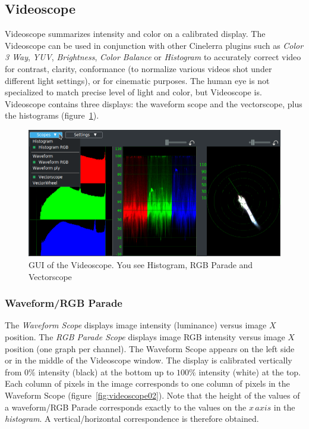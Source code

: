 {\subsection{Videoscope}%
\label{sub:videoscope}

Videoscope summarizes intensity and color on a calibrated display. The Videoscope can be used in conjunction with other Cinelerra plugins such as \textit{Color 3 Way}, \textit{YUV}, \textit{Brightness}, \textit{Color Balance} or \textit{Histogram} to accurately correct video for contrast, clarity, conformance (to normalize various videos shot under different light settings), or for cinematic purposes. The human eye is not specialized to match precise level of light and color, but Videoscope is. Videoscope contains three displays: the waveform scope and the vectorscope, plus the histograms (figure~\ref{fig:videoscope01}).

\begin{figure}[hbtp]
    \centering
    \includegraphics[width=0.8\linewidth]{images/videoscope01.png}
    \caption{GUI of the Videoscope. You see Histogram, RGB Parade and Vectorscope}
    \label{fig:videoscope01}
\end{figure}

\subsubsection*{Waveform/RGB Parade}%
\label{ssub:waveform_rgb_parade}

The \textit{Waveform Scope} displays image intensity (luminance) versus image $X$ position. The \textit{RGB Parade Scope} displays image RGB intensity versus image $X$ position (one graph per channel). The Waveform Scope appears on the left side or in the middle of the Videoscope window. The display is calibrated vertically from $0\%$ intensity (black) at the bottom up to $100\%$ intensity (white) at the top. Each column of pixels in the image corresponds to one column of pixels in the Waveform Scope (figure~\ref{fig:videoscope02}). Note that the height of the values of a waveform/RGB Parade corresponds exactly to the values on the $x\, axis$ in the \textit{histogram}. A vertical/horizontal correspondence is therefore obtained.

}
